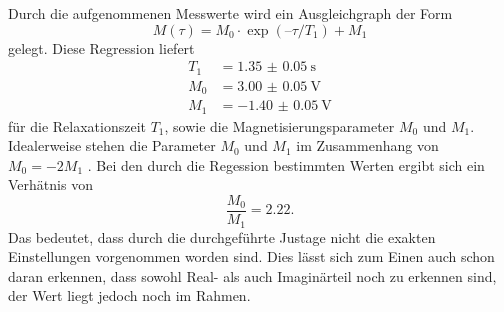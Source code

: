 Durch die aufgenommenen Messwerte wird ein Ausgleichgraph der Form
\begin{equation}
  M(\tau) = M_0 \cdot \exp(–\tau/T_1) + M_1
\end{equation}
gelegt. Diese Regression liefert 
\begin{align}
  T_1 &= \SI{1.35(005)}{\second} \\
  M_0 &= \SI{3.00(005)}{\volt} \\
  M_1 &= \SI{-1.40(005)}{\volt}
\end{align} \noindent
für die Relaxationszeit $T_1$, sowie die Magnetisierungsparameter $M_0$ und $M_1$.
Idealerweise stehen die Parameter $M_0$ und $M_1$ im Zusammenhang von $M_0 = -2M_1$ \cite{anleitung}. Bei den durch die Regession bestimmten
Werten ergibt sich ein Verhätnis von
\begin{equation}
  \frac{M_0}{M_1} = 2.22.
\end{equation}
Das bedeutet, dass durch die durchgeführte Justage nicht die exakten Einstellungen vorgenommen worden sind. Dies lässt
sich zum Einen auch schon daran erkennen, dass sowohl Real- als auch Imaginärteil noch zu erkennen sind, der Wert liegt jedoch
noch im Rahmen.

